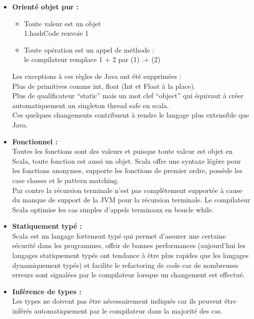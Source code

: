 \begin{itemize}
\item[\textbullet]\textbf{Orienté objet pur :}
  \begin{itemize}
  \item Toute valeur est un objet \\
    1.hashCode renvoie 1
  \item Toute opération est un appel de méthode :\\
    le compilateur remplace 1 + 2 par (1) .+ (2)\\
  \end{itemize}
  Les exceptions à ces règles de Java ont été supprimées :\\
  Plus de primitives comme int, float (Int et Float à la place).\\
  Plus de qualificateur ``static'' mais un mot clef ``object'' qui équivaut à créer
  automatiquement un singleton thread safe en scala. \\
  Ces quelques changements contribuent à rendre le langage plus extensible
  que Java.\\
\item[\textbullet]\textbf{Fonctionnel :}\\ 
  Toutes les fonctions sont des valeurs et puisque toute valeur est objet en
  Scala, toute fonction est aussi un objet. 
  Scala offre une syntaxe légère pour les fonctions anonymes, supporte les
  fonctions de premier ordre, possède les case classes et le pattern matching.\\
  Par contre la récursion terminale n'est pas complètement supportée à cause du
  manque de support de la JVM pour la récursion terminale. Le compilateur Scala
  optimise les cas simples d'appels terminaux en boucle while.\\
\item[\textbullet]\textbf{Statiquement typé :}\\
  Scala est un langage fortement typé qui permet d'assurer une certaine sécurité
  dans les programmes, offrir de bonnes performances (aujourd'hui les langages
  statiquement typés ont tendance à être plus rapides que les langages
  dynamiquement typés) et facilite le refactoring de code car de nombreuses
  erreurs sont signalées par le compilateur lorsque un changement est effectué.\\
\item[\textbullet]\textbf{Inférence de types :}\\
  Les types ne doivent pas être nécessairement indiqués car ils peuvent être
  inférés automatiquement par le compilateur dans la majorité des cas.\\

\end{itemize}
